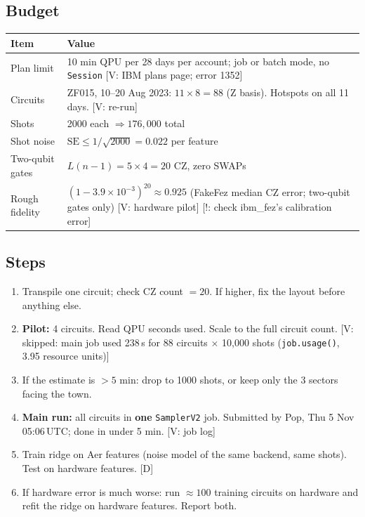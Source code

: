 \documentclass[11pt,a4paper]{article}
\newcommand{\tagbox}[2]{{\footnotesize\color{#1}\textsf{[#2]}}}
\newcommand{\veri}[1]{\tagbox{ForestGreen!70!black}{V: #1}}  %
\newcommand{\ours}{\tagbox{NavyBlue}{D}}                      %
\newcommand{\caut}[1]{\tagbox{BrickRed}{!: #1}}               %
\newcommand{\code}[1]{\texttt{\small #1}}
\begin{document}
\subsection{Budget}
\begin{center}\small
\begin{tabularx}{\linewidth}{@{}l Y@{}}
\toprule
\textbf{Item} & \textbf{Value}\\
\midrule
Plan limit & 10 min QPU per 28 days per account; job or batch mode, no \code{Session} \veri{IBM plans page; error 1352}\\
Circuits & ZF015, 10--20 Aug 2023: $11\times8=88$ (Z basis). Hotspots on all 11 days. \veri{re-run}\\
Shots & 2000 each $\Rightarrow176{,}000$ total\\
Shot noise & $\mathrm{SE}\le1/\sqrt{2000}=0.022$ per feature\\
Two-qubit gates & $L(n-1)=5\times4=20$ CZ, zero SWAPs\\
Rough fidelity & $(1-3.9{\times}10^{-3})^{20}\approx0.925$ (FakeFez median CZ error; two-qubit gates only) \veri{hardware pilot}
\caut{check ibm\_fez's calibration error}\\
\bottomrule
\end{tabularx}
\end{center}

\subsection{Steps}
\begin{enumerate}
\item Transpile one circuit; check CZ count $=20$. If higher, fix the layout before anything else.
\item \textbf{Pilot:} 4 circuits. Read QPU seconds used. Scale to the full circuit count. \veri{skipped: main job
  used 238\,s for 88 circuits $\times$ 10{,}000 shots (\code{job.usage()}, 3.95 resource units)}
\item If the estimate is $>5$ min: drop to 1000 shots, or keep only the 3 sectors facing the town.
\item \textbf{Main run:} all circuits in \textbf{one} \code{SamplerV2} job. Submitted by Pop, Thu 5 Nov 05:06\,UTC; done in under 5 min. \veri{job log}
\item Train ridge on Aer features (noise model of the same backend, same shots). Test on hardware features. \ours
\item If hardware error is much worse: run $\approx100$ training circuits on hardware and refit the ridge on hardware
  features. Report both.
\end{enumerate}
\end{document}
